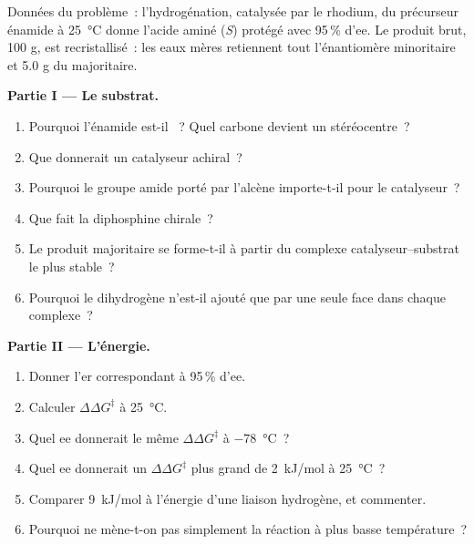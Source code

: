 \begin{problem}
\label{pb:b3:asymmetric-synthesis:1}
Données du problème~: l'hydrogénation, catalysée par le rhodium, du
précurseur énamide à \qty{25}{\celsius} donne l'acide aminé (\textit{S}) protégé avec 95\,\% d'ee. Le produit
brut, 100 g, est recristallisé~: les eaux mères retiennent tout
l'énantiomère minoritaire et 5.0 g du majoritaire.

\medskip\noindent\textbf{Partie I --- Le substrat.}
\begin{enumerate}
  \item Pourquoi l'énamide est-il ~? Quel carbone devient un
        stéréocentre~?
  \item Que donnerait un catalyseur achiral~?
  \item Pourquoi le groupe amide porté par l'alcène importe-t-il pour le
        catalyseur~?
  \item Que fait la diphosphine chirale~?
  \item Le produit majoritaire se forme-t-il à partir du complexe
        catalyseur--substrat le plus stable~?
  \item Pourquoi le dihydrogène n'est-il ajouté que par une seule face dans
        chaque complexe~?
\end{enumerate}

\medskip\noindent\textbf{Partie II --- L'énergie.}
\begin{enumerate}[resume]
  \item Donner l'er correspondant à 95\,\% d'ee.
  \item Calculer $\Delta\Delta G^\ddagger$ à \qty{25}{\celsius}.
  \item Quel ee donnerait le même $\Delta\Delta G^\ddagger$ à \qty{-78}{\celsius}~?
  \item Quel ee donnerait un $\Delta\Delta G^\ddagger$ plus grand de \qty{2}{kJ/mol} à \qty{25}{\celsius}~?
  \item Comparer \qty{9}{kJ/mol} à l'énergie d'une liaison hydrogène, et
        commenter.
  \item Pourquoi ne mène-t-on pas simplement la réaction à plus basse
        température~?
\end{enumerate}


\end{problem}
